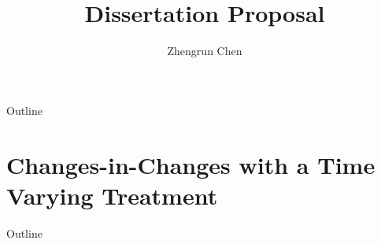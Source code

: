 \documentclass[aspectratio=1610, 9pt]{beamer}
\title[Chen 2025]{Dissertation Proposal}
\author{Zhengrun Chen}
\begin{document}
\maketitle

\begin{frame}{Outline}
    \tableofcontents
\end{frame}


\section{Changes-in-Changes with a Time Varying Treatment}

\begin{frame}{Outline}
    \tableofcontents[sectionstyle=show/shaded]
\end{frame}

\end{document}
